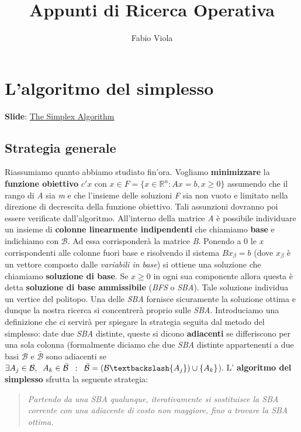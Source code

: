 \documentclass[11pt]{book}
\title{Appunti di Ricerca Operativa}
\author{Fabio Viola}
\date{}
\begin{document}
\chapter{L'algoritmo del simplesso}

\scriptsize
{\bf Slide}:
\href{http://www.or.deis.unibo.it/staff_pages/martello/Chapter4.zip}{The
Simplex Algorithm}
\normalsize
\vspace{20pt}

\section{Strategia generale}

Riassumiamo quanto abbiamo studiato fin'ora. Vogliamo {\bf
  minimizzare} la {\bf funzione obiettivo} $c'x$ con $x \in F = \{ x
\in \mathbb{R}^n : Ax = b, x \geq 0 \}$ assumendo che il rango di {\em
  A} sia {\em m} e che l'insieme delle soluzioni {\em F} sia non vuoto
e limitato nella direzione di decrescita della funzione
obiettivo. Tali assunzioni dovranno poi essere verificate
dall'algoritmo. All'interno della matrice {\em A} \`e possibile
individuare un insieme di {\bf colonne linearmente indipendenti} che
chiamiamo {\bf base} e indichiamo con $\mathcal{B}$. Ad essa
corrisponder\`a la matrice {\em B}. Ponendo a 0 le {\em x}
corrispondenti alle colonne fuori base e risolvendo il sistema
$Bx_\beta = b$ (dove $x_\beta$ \`e un vettore composto dalle {\em
  variabili in base}) si ottiene una soluzione che chiamiamo {\bf
  soluzione di base}. Se $x \geq 0$ in ogni sua componente allora
questa \`e detta {\bf soluzione di base ammissibile} ({\em BFS} o {\em
  SBA}). Tale soluzione individua un vertice del politopo. Una delle
{\em SBA} fornisce sicuramente la soluzione ottima e dunque la nostra
ricerca si concentrer\`a proprio sulle {\em SBA}. Introduciamo una
definizione che ci servir\`a per spiegare la strategia seguita dal
metodo del simplesso: date due {\em SBA} distinte, queste si dicono
{\bf adiacenti} se differiscono per una sola colonna (formalmente
diciamo che due {\em SBA} distinte appartenenti a due basi
$\mathcal{B}$ e $\bar{\mathcal{B}}$ sono adiacenti se $\exists A_j \in
\mathcal{B},\phantom{a}A_k \in
\bar{\mathcal{B}}\phantom{a}:\phantom{a}\bar{\mathcal{B}} =
(\mathcal{B} \textbackslash \{ A_j \}) \cup \{ A_k \}$). L'{\bf
  algoritmo del simplesso} sfrutta la seguente strategia:

\begin{quote}
{\em Partendo da una {\em SBA} qualunque, iterativamente si sostituisce la
{\em SBA} corrente con una adiacente di costo non maggiore, fino a
trovare la {\em SBA} ottima.}
\end{quote}
\end{document}
